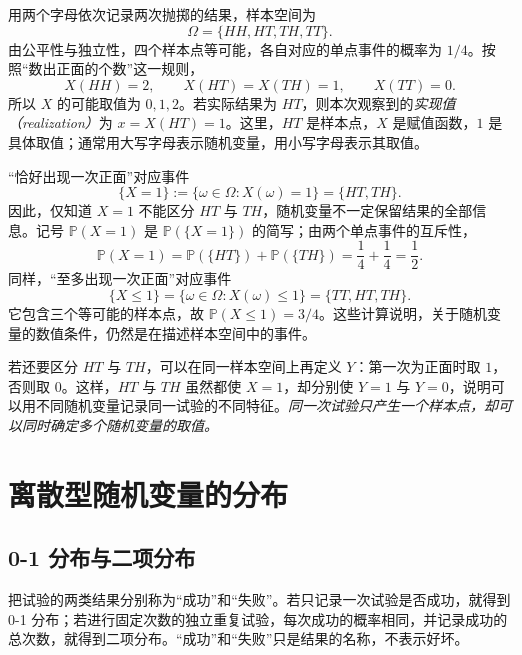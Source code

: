 \documentclass[UTF8,12pt,a4paper,fontset=fandol]{ctexbook}
\begin{document}
\begin{solve}
用两个字母依次记录两次抛掷的结果，样本空间为
\[
  \Omega=\{HH,HT,TH,TT\}.
\]
由公平性与独立性，四个样本点等可能，各自对应的单点事件的概率为 $1/4$。按照“数出正面的个数”这一规则，
\begin{equation}
  X(HH)=2,\qquad X(HT)=X(TH)=1,\qquad X(TT)=0.
  \label{eq:study-random-variable-coin-map}
\end{equation}
所以 $X$ 的可能取值为 $0,1,2$。若实际结果为 $HT$，则本次观察到的\emph{实现值（realization）}为 $x=X(HT)=1$。这里，$HT$ 是样本点，$X$ 是赋值函数，$1$ 是具体取值；通常用大写字母表示随机变量，用小写字母表示其取值。

“恰好出现一次正面”对应事件
\begin{equation}
  \{X=1\}:=\{\omega\in\Omega:X(\omega)=1\}
    =\{HT,TH\}.
  \label{eq:study-random-variable-coin-event}
\end{equation}
因此，仅知道 $X=1$ 不能区分 $HT$ 与 $TH$，随机变量不一定保留结果的全部信息。记号 $\mathbb P(X=1)$ 是 $\mathbb P(\{X=1\})$ 的简写；由两个单点事件的互斥性，
\[
  \mathbb P(X=1)=\mathbb P(\{HT\})+\mathbb P(\{TH\})
    =\frac14+\frac14=\frac12.
\]
同样，“至多出现一次正面”对应事件
\[
  \{X\le1\}=\{\omega\in\Omega:X(\omega)\le1\}
    =\{TT,HT,TH\}.
\]
它包含三个等可能的样本点，故 $\mathbb P(X\le1)=3/4$。这些计算说明，关于随机变量的数值条件，仍然是在描述样本空间中的事件。

若还要区分 $HT$ 与 $TH$，可以在同一样本空间上再定义 $Y$：第一次为正面时取 $1$，否则取 $0$。这样，$HT$ 与 $TH$ 虽然都使 $X=1$，却分别使 $Y=1$ 与 $Y=0$，说明可以用不同随机变量记录同一试验的不同特征。\emph{同一次试验只产生一个样本点，却可以同时确定多个随机变量的取值。}
\end{solve}

\section{离散型随机变量的分布}
\label{sec:study-discrete-distributions}

\subsection{0-1 分布与二项分布}
\label{subsec:study-bernoulli-binomial}

把试验的两类结果分别称为“成功”和“失败”。若只记录一次试验是否成功，就得到 0-1 分布；若进行固定次数的独立重复试验，每次成功的概率相同，并记录成功的总次数，就得到二项分布。“成功”和“失败”只是结果的名称，不表示好坏。
\end{document}
